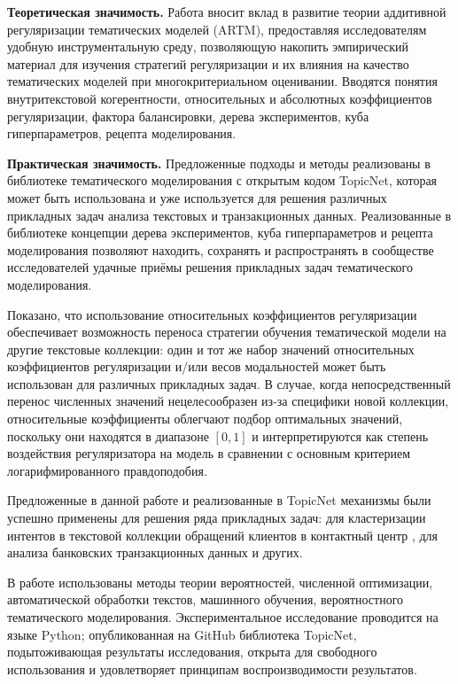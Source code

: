 \textbf{Теоретическая значимость.}  
Работа вносит вклад в развитие теории аддитивной регуляризации тематических моделей (ARTM), предоставляя исследователям удобную инструментальную среду, позволяющую накопить эмпирический материал для изучения стратегий регуляризации и их влияния на качество тематических моделей при многокритериальном оценивании. Вводятся понятия внутритекстовой когерентности, относительных и абсолютных коэффициентов регуляризации, фактора балансировки, дерева экспериментов, куба гиперпараметров, рецепта моделирования. 

\textbf{Практическая значимость.}  
Предложенные подходы и методы реализованы в библиотеке тематического моделирования с открытым кодом TopicNet, которая может быть использована и уже используется для решения различных прикладных задач анализа текстовых и транзакционных данных. Реализованные в библиотеке концепции дерева экспериментов, куба гиперпараметров и рецепта моделирования позволяют находить, сохранять и распространять в сообществе исследователей удачные приёмы решения прикладных задач тематического моделирования. 

Показано, что использование относительных коэффициентов регуляризации обеспечивает возможность переноса стратегии обучения тематической модели на другие текстовые коллекции: один и тот же набор значений относительных коэффициентов регуляризации и/или весов модальностей может быть использован для различных прикладных задач. В случае, когда непосредственный перенос численных значений нецелесообразен из-за специфики новой коллекции, относительные коэффициенты облегчают подбор оптимальных значений, поскольку они находятся в диапазоне $[0, 1]$ и интерпретируются как степень воздействия регуляризатора на модель в сравнении с основным критерием логарифмированного правдоподобия. 

Предложенные в данной работе и реализованные в TopicNet механизмы были успешно применены для решения ряда прикладных задач:  
для кластеризации интентов в текстовой коллекции обращений клиентов в контактный центр \cite{popov_hier},  
для анализа банковских транзакционных данных \cite{egorov2019topic} и других. 

{\methods} В работе использованы методы теории вероятностей, численной оптимизации, автоматической обработки текстов, машинного обучения, вероятностного тематического моделирования. Экспериментальное исследование проводится на языке Python; опубликованная на GitHub библиотека TopicNet, подытоживающая результаты исследования, открыта для свободного использования и удовлетворяет принципам воспроизводимости результатов. 

